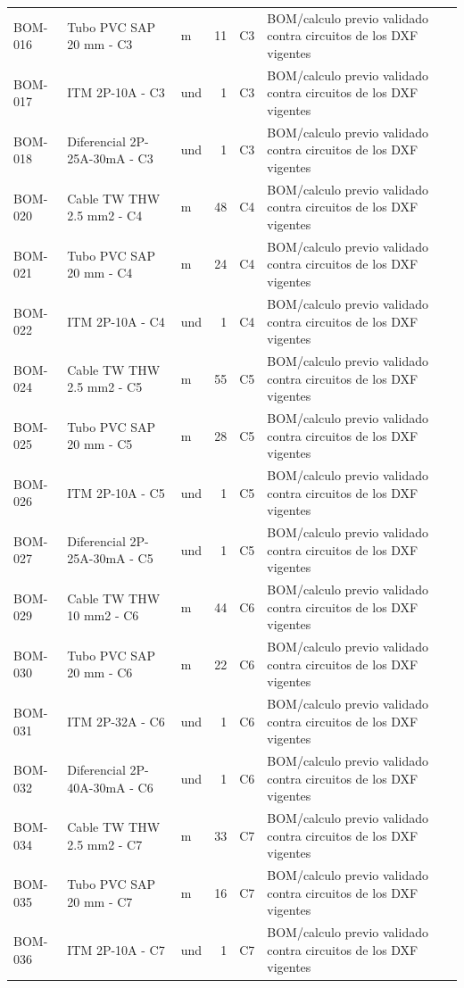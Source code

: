 \begin{longtable}{p{1.5cm}p{5.5cm}p{0.8cm}r p{1.2cm}p{4.0cm}}
BOM-016 & Tubo PVC SAP 20 mm - C3 & m & 11 & C3 & BOM/calculo previo validado contra circuitos de los DXF vigentes \\
BOM-017 & ITM 2P-10A - C3 & und & 1 & C3 & BOM/calculo previo validado contra circuitos de los DXF vigentes \\
BOM-018 & Diferencial 2P-25A-30mA - C3 & und & 1 & C3 & BOM/calculo previo validado contra circuitos de los DXF vigentes \\
BOM-020 & Cable TW THW 2.5 mm2 - C4 & m & 48 & C4 & BOM/calculo previo validado contra circuitos de los DXF vigentes \\
BOM-021 & Tubo PVC SAP 20 mm - C4 & m & 24 & C4 & BOM/calculo previo validado contra circuitos de los DXF vigentes \\
BOM-022 & ITM 2P-10A - C4 & und & 1 & C4 & BOM/calculo previo validado contra circuitos de los DXF vigentes \\
BOM-024 & Cable TW THW 2.5 mm2 - C5 & m & 55 & C5 & BOM/calculo previo validado contra circuitos de los DXF vigentes \\
BOM-025 & Tubo PVC SAP 20 mm - C5 & m & 28 & C5 & BOM/calculo previo validado contra circuitos de los DXF vigentes \\
BOM-026 & ITM 2P-10A - C5 & und & 1 & C5 & BOM/calculo previo validado contra circuitos de los DXF vigentes \\
BOM-027 & Diferencial 2P-25A-30mA - C5 & und & 1 & C5 & BOM/calculo previo validado contra circuitos de los DXF vigentes \\
BOM-029 & Cable TW THW 10 mm2 - C6 & m & 44 & C6 & BOM/calculo previo validado contra circuitos de los DXF vigentes \\
BOM-030 & Tubo PVC SAP 20 mm - C6 & m & 22 & C6 & BOM/calculo previo validado contra circuitos de los DXF vigentes \\
BOM-031 & ITM 2P-32A - C6 & und & 1 & C6 & BOM/calculo previo validado contra circuitos de los DXF vigentes \\
BOM-032 & Diferencial 2P-40A-30mA - C6 & und & 1 & C6 & BOM/calculo previo validado contra circuitos de los DXF vigentes \\
BOM-034 & Cable TW THW 2.5 mm2 - C7 & m & 33 & C7 & BOM/calculo previo validado contra circuitos de los DXF vigentes \\
BOM-035 & Tubo PVC SAP 20 mm - C7 & m & 16 & C7 & BOM/calculo previo validado contra circuitos de los DXF vigentes \\
BOM-036 & ITM 2P-10A - C7 & und & 1 & C7 & BOM/calculo previo validado contra circuitos de los DXF vigentes \\

\end{longtable}

